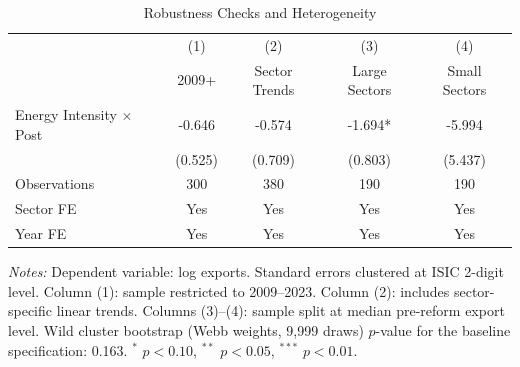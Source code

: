 \begin{table}[htbp]
\centering
\caption{Robustness Checks and Heterogeneity}
\label{tab:robustness}
\begin{tabular}{lcccc}
\toprule
 & (1) & (2) & (3) & (4) \\
 & 2009+ & Sector Trends & Large Sectors & Small Sectors \\
\midrule
Energy Intensity $\times$ Post & -0.646 & -0.574 & -1.694* & -5.994 \\
 & (0.525) & (0.709) & (0.803) & (5.437) \\
\midrule
Observations & 300 & 380 & 190 & 190 \\
Sector FE & Yes & Yes & Yes & Yes \\
Year FE & Yes & Yes & Yes & Yes \\
\bottomrule
\end{tabular}
\begin{tablenotes}
\small
\item \textit{Notes:} Dependent variable: log exports. Standard errors clustered at ISIC 2-digit level. Column (1): sample restricted to 2009--2023. Column (2): includes sector-specific linear trends. Columns (3)--(4): sample split at median pre-reform export level. Wild cluster bootstrap (Webb weights, 9,999 draws) $p$-value for the baseline specification: 0.163. $^{*}$ $p < 0.10$, $^{**}$ $p < 0.05$, $^{***}$ $p < 0.01$.
\end{tablenotes}
\end{table}
